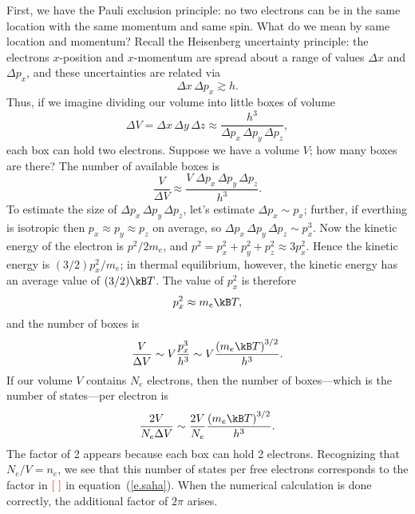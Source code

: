 First, we have the Pauli exclusion principle: no two electrons can be in the same location with the same momentum and same spin. What do we mean by same location and momentum?  Recall the Heisenberg uncertainty principle: the electrons $x$-position and $x$-momentum are spread about a range of values $\Delta x$ and $\Delta p_{x}$, and these uncertainties are related via
\[ \Delta x\,\Delta p_{x} \gtrsim h. \]
Thus, if we imagine dividing our volume into little boxes of volume
\[ 
 \Delta V = \Delta x\,\Delta y\,\Delta z \approx \frac{h^{3}}{\Delta p_{x}\,\Delta p_{y}\,\Delta p_{z}},
\]
each box can hold two electrons. Suppose we have a volume $V$; how many boxes are there?  The number of available boxes is
\[
	\frac{V}{\Delta V} \approx \frac{V\;\Delta p_{x}\,\Delta p_{y}\,\Delta p_{z}}{h^{3}}.
\]
To estimate the size of $\Delta p_{x}\,\Delta p_{y}\,\Delta p_{z}$, let's estimate $\Delta p_{x}\sim p_{x}$; further, if everthing is isotropic then $p_{x}\approx p_{y}\approx p_{z}$ on average, so $\Delta p_{x}\,\Delta p_{y}\,\Delta p_{z} \sim p_{x}^{3}$.  Now the kinetic energy of the electron is $p^{2}/2m_{e}$, and $p^{2} = p_{x}^{2} + p_{y}^{2} + p_{z}^{2} \approx 3 p_{x}^{2}$. Hence the kinetic energy is $(3/2)p_{x}^{2}/m_{e}$; in thermal equilibrium, however, the kinetic energy has an average value of $(3/2)\kB T$.  The value of $p_{x}^{2}$ is therefore
\[
	p_{x}^{2} \approx m_{e}\kB T,
\]
and the number of boxes is
\[
	\frac{V}{\Delta V} \sim V\frac{p_{x}^{3}}{h^{3}} \sim V\frac{\left(m_{e}\kB T\right)^{3/2}}{h^{3}}.
\]
If our volume $V$ contains $N_{e}$ electrons, then the number of boxes---which is the number of states---per electron is
\[
	\frac{2V}{N_{e}\Delta V} \sim \frac{2V}{N_{e}}\frac{\left(m_{e}\kB T\right)^{3/2}}{h^{3}}.
\]
The factor of 2 appears because each box can hold 2 electrons.  Recognizing that $N_{e}/V = n_{e}$, we see that this number of states per free electrons corresponds to the factor in $\color{red}\left[\;\right]$ in equation~(\ref{e.saha}). When the numerical calculation is done correctly, the additional factor of $2\pi$ arises.

